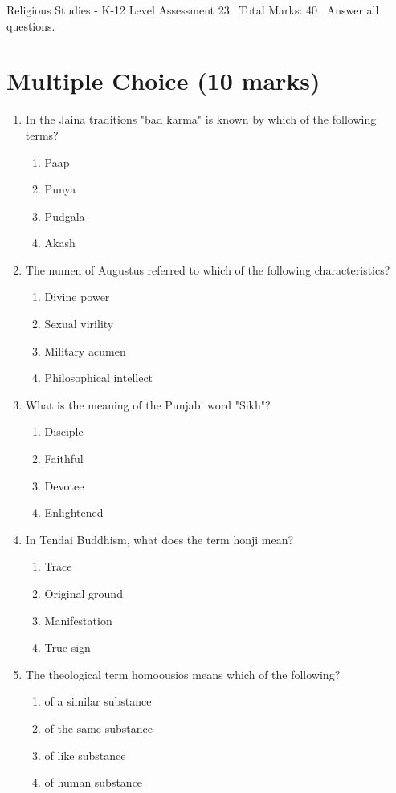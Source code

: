\documentclass[12pt]{article}
\begin{document}
\begin{center}
Religious Studies - K-12 Level Assessment 23 \
Total Marks: 40 \
Answer all questions.
\end{center}

\section*{Multiple Choice (10 marks)}
\begin{enumerate}[label=\arabic*.]
\item In the Jaina traditions "bad karma" is known by which of the following terms?
\begin{enumerate}[label=(\alph*)]
    \item Paap
    \item Punya
    \item Pudgala
    \item Akash
\end{enumerate}
\item The numen of Augustus referred to which of the following characteristics?
\begin{enumerate}[label=(\alph*)]
    \item Divine power
    \item Sexual virility
    \item Military acumen
    \item Philosophical intellect
\end{enumerate}
\item What is the meaning of the Punjabi word "Sikh"?
\begin{enumerate}[label=(\alph*)]
    \item Disciple
    \item Faithful
    \item Devotee
    \item Enlightened
\end{enumerate}
\item In Tendai Buddhism, what does the term honji mean?
\begin{enumerate}[label=(\alph*)]
    \item Trace
    \item Original ground
    \item Manifestation
    \item True sign
\end{enumerate}
\item The theological term homoousios means which of the following?
\begin{enumerate}[label=(\alph*)]
    \item of a similar substance
    \item of the same substance
    \item of like substance
    \item of human substance
\end{enumerate}
\end{enumerate}
\end{document}
